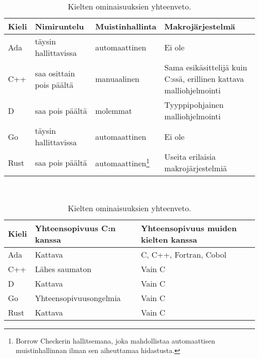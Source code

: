 \begin{table}[ht!]
    \begin{adjustbox}{center}
        \kern-0.7cm
        \begin{tabular}{@{}lllp{6.2cm}@{}} \toprule
        Kieli & Nimiruntelu              & Muistinhallinta & Makrojärjestelmä \\ \midrule
        Ada   & täysin hallittavissa     & automaattinen   & Ei ole \\
        C++   & saa osittain pois päältä & manuaalinen     & Sama esikäsittelijä kuin C:ssä, \mbox{erillinen} kattava malliohjelmointi \\
        D     & saa pois päältä          & molemmat        & Tyyppipohjainen malliohjelmointi \\
        Go    & täysin hallittavissa     & automaattinen   & Ei ole \\
        Rust  & saa pois päältä & automaattinen\footnote{Borrow Checkerin hallitsemana, joka mahdollistaa automaattisen muistinhallinnan ilman sen aiheuttamaa hidastusta.} & Useita erilaisia makrojärjestelmiä \\ \bottomrule
    \end{tabular}
    \end{adjustbox} \\[0.5cm]

    \begin{adjustbox}{center}
        \begin{tabular}{@{}lll@{}} \toprule
            Kieli & Yhteensopivuus C:n kanssa                                                   & Yhteensopivuus muiden kielten kanssa \\ \midrule
            Ada   & Kattava         & C, C++, Fortran, Cobol \\
            C++   & Lähes saumaton                                                              & Vain C \\
            D     & Kattava         & Vain C \\
            Go    & Yhteensopivuusongelmia   & Vain C \\
            Rust  & Kattava         & Vain C \\ \bottomrule
        \end{tabular}
    \end{adjustbox}
    \caption{
        Kielten ominaisuuksien yhteenveto.
    }
    \label{table:properties}
\end{table}


